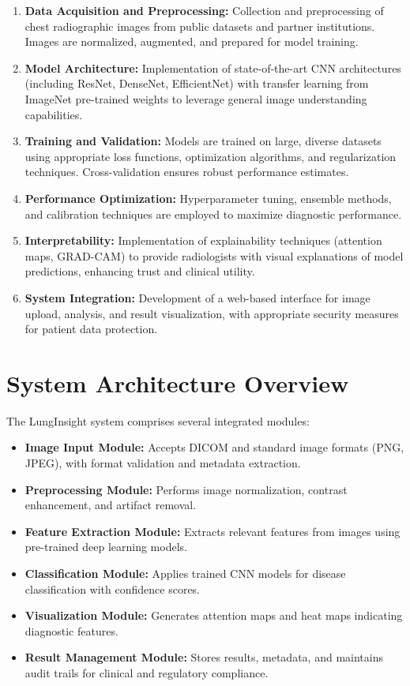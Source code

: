 {\begin{enumerate}
    \item \textbf{Data Acquisition and Preprocessing:} Collection and preprocessing of chest radiographic images from public datasets and partner institutions. Images are normalized, augmented, and prepared for model training.
    \item \textbf{Model Architecture:} Implementation of state-of-the-art CNN architectures (including ResNet, DenseNet, EfficientNet) with transfer learning from ImageNet pre-trained weights to leverage general image understanding capabilities.
    \item \textbf{Training and Validation:} Models are trained on large, diverse datasets using appropriate loss functions, optimization algorithms, and regularization techniques. Cross-validation ensures robust performance estimates.
    \item \textbf{Performance Optimization:} Hyperparameter tuning, ensemble methods, and calibration techniques are employed to maximize diagnostic performance.
    \item \textbf{Interpretability:} Implementation of explainability techniques (attention maps, GRAD-CAM) to provide radiologists with visual explanations of model predictions, enhancing trust and clinical utility.
    \item \textbf{System Integration:} Development of a web-based interface for image upload, analysis, and result visualization, with appropriate security measures for patient data protection.
\end{enumerate}

\section{System Architecture Overview}

The LungInsight system comprises several integrated modules:

\begin{itemize}
    \item \textbf{Image Input Module:} Accepts DICOM and standard image formats (PNG, JPEG), with format validation and metadata extraction.
    \item \textbf{Preprocessing Module:} Performs image normalization, contrast enhancement, and artifact removal.
    \item \textbf{Feature Extraction Module:} Extracts relevant features from images using pre-trained deep learning models.
    \item \textbf{Classification Module:} Applies trained CNN models for disease classification with confidence scores.
    \item \textbf{Visualization Module:} Generates attention maps and heat maps indicating diagnostic features.
    \item \textbf{Result Management Module:} Stores results, metadata, and maintains audit trails for clinical and regulatory compliance.
\end{itemize}

}
